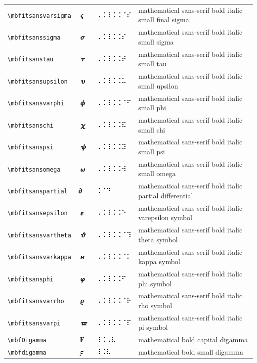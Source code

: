 \documentclass[oneside]{article}
\begin{document}
\begin{longtable}{llll}
\verb|\mbfitsansvarsigma| & $\mbfitsansvarsigma$ &  ⠠⠨⠸⠨⠨⠈⠎  & {mathematical sans-serif bold italic small final sigma} \\[2ex]
\verb|\mbfitsanssigma| & $\mbfitsanssigma$ &  ⠠⠨⠸⠨⠨⠎  & {mathematical sans-serif bold italic small sigma} \\[2ex]
\verb|\mbfitsanstau| & $\mbfitsanstau$ &  ⠠⠨⠸⠨⠨⠞  & {mathematical sans-serif bold italic small tau} \\[2ex]
\verb|\mbfitsansupsilon| & $\mbfitsansupsilon$ &  ⠠⠨⠸⠨⠨⠥  & {mathematical sans-serif bold italic small upsilon} \\[2ex]
\verb|\mbfitsansvarphi| & $\mbfitsansvarphi$ &  ⠠⠨⠸⠨⠨⠈⠋  & {mathematical sans-serif bold italic small phi} \\[2ex]
\verb|\mbfitsanschi| & $\mbfitsanschi$ &  ⠠⠨⠸⠨⠨⠯  & {mathematical sans-serif bold italic small chi} \\[2ex]
\verb|\mbfitsanspsi| & $\mbfitsanspsi$ &  ⠠⠨⠸⠨⠨⠽  & {mathematical sans-serif bold italic small psi} \\[2ex]
\verb|\mbfitsansomega| & $\mbfitsansomega$ &  ⠠⠨⠸⠨⠨⠺  & {mathematical sans-serif bold italic small omega} \\[2ex]
\verb|\mbfitsanspartial| & $\mbfitsanspartial$ &  ⠨⠈⠙  & {mathematical sans-serif bold italic partial differential} \\[2ex]
\verb|\mbfitsansepsilon| & $\mbfitsansepsilon$ &  ⠠⠨⠸⠨⠨⠑  & {mathematical sans-serif bold italic varepsilon symbol} \\[2ex]
\verb|\mbfitsansvartheta| & $\mbfitsansvartheta$ &  ⠠⠨⠸⠨⠨⠈⠹  & {mathematical sans-serif bold italic theta symbol} \\[2ex]
\verb|\mbfitsansvarkappa| & $\mbfitsansvarkappa$ &  ⠠⠨⠸⠨⠨⠈⠅  & {mathematical sans-serif bold italic kappa symbol} \\[2ex]
\verb|\mbfitsansphi| & $\mbfitsansphi$ &  ⠠⠨⠸⠨⠨⠋  & {mathematical sans-serif bold italic phi symbol} \\[2ex]
\verb|\mbfitsansvarrho| & $\mbfitsansvarrho$ &  ⠠⠨⠸⠨⠨⠈⠗  & {mathematical sans-serif bold italic rho symbol} \\[2ex]
\verb|\mbfitsansvarpi| & $\mbfitsansvarpi$ &  ⠠⠨⠸⠨⠨⠈⠏  & {mathematical sans-serif bold italic pi symbol} \\[2ex]
\verb|\mbfDigamma| & $\mbfDigamma$ &  ⠸⠨⠠⠧  & {mathematical bold capital digamma} \\[2ex]
\verb|\mbfdigamma| & $\mbfdigamma$ &  ⠸⠨⠧  & {mathematical bold small digamma} \\[2ex]
\end{longtable}
\end{document}
